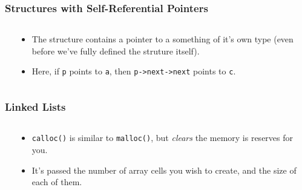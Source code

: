 
\begin{frame}[fragile]
\frametitle{Structures with Self-Referential Pointers}
\begin{columns}[T]

\begin{column}{0.45\textwidth}

\end{column}

\pause
\begin{column}{0.45\textwidth}
\begin{itemize}[<+->]
\item The structure contains a pointer to a something of it's own type (even before we've fully defined the struture itself).
\item Here, if \verb^p^ points to \verb^a^, then \verb^p->next->next^ points to \verb^c^.
\end{itemize}
\end{column}

\end{columns}
\end{frame}



\begin{frame}[fragile]
\frametitle{Linked Lists}
\begin{columns}[T]

\begin{column}{0.45\textwidth}

\end{column}

\pause
\begin{column}{0.45\textwidth}

\begin{itemize}[<+->]
\item \verb^calloc()^ is similar to \verb^malloc()^, but {\em clears} the memory is reserves for you.
\item It's passed the number of array cells you wish to create, and the size of each of them.
\end{itemize}
\end{column}

\end{columns}
\end{frame}


